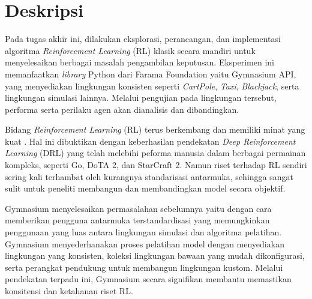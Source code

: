 \documentclass[a4paper,twoside]{article}
\begin{document}
	
	\title{\@judultopik}
	\author{\nama \textendash \@npm} 
	
	\newcommand{\nama}{Bryan Ricaldi Chandra}
	\newcommand{\@npm}{6182301013}
	\newcommand{\@judultopik}{Explorasi Reinforcement Learning menggunakan Gymnasium} %
	\newcommand{\jumpemb}{1} %
	\newcommand{\tanggal}{04/09/2026}
	
	
	\maketitle
	
	
	\section{Deskripsi}
	Pada tugas akhir ini, dilakukan eksplorasi, perancangan, dan implementasi algoritma \textit{Reinforcement Learning} (RL) klasik secara mandiri untuk menyelesaikan berbagai masalah pengambilan keputusan. Eksperimen ini memanfaatkan \textit{library} Python dari Farama Foundation yaitu Gymnasium API, yang menyediakan lingkungan konsisten seperti \textit{CartPole}, \textit{Taxi}, \textit{Blackjack}, serta lingkungan simulasi lainnya. Melalui pengujian pada lingkungan tersebut, performa serta perilaku agen akan dianalisis dan dibandingkan.
	
	Bidang \textit{Reinforcement Learning} (RL) terus berkembang dan memiliki minat yang kuat . Hal ini dibuktikan dengan keberhasilan pendekatan \textit{Deep Reinforcement Learning} (DRL) yang telah melebihi peforma manusia dalam berbagai permainan kompleks, seperti Go, DoTA 2, dan StarCraft 2. Namun riset terhadap RL sendiri sering kali terhambat oleh kurangnya standarisasi antarmuka, sehingga sangat sulit untuk peneliti membangun dan membandingkan model secara objektif.
	
	Gymnasium menyelesaikan permasalahan sebelumnya yaitu dengan cara memberikan pengguna antarmuka terstandardisasi yang memungkinkan penggunaan yang luas antara lingkungan simulasi dan algoritma pelatihan.  Gymnasium menyederhanakan proses pelatihan model dengan menyediakan lingkungan yang konsisten, koleksi lingkungan bawaan yang mudah dikonfigurasi, serta perangkat pendukung untuk membangun lingkungan kustom. Melalui pendekatan terpadu ini, Gymnasium secara signifikan membantu memastikan konsitensi dan ketahanan riset RL.
	
\end{document}
